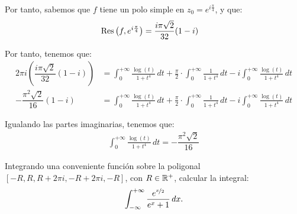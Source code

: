 \begin{ejercicio}
    Por tanto, sabemos que $f$ tiene un polo simple en $z_0 = e^{i\frac{\pi}{4}}$, y que:
    \begin{align*}
        \operatorname{Res}\left(f, e^{i\frac{\pi}{4}}\right) &= \dfrac{i\pi\sqrt{2}}{32}(1-i)
    \end{align*}

    Por tanto, tenemos que:
    \begin{align*}
        2\pi i\left(\dfrac{i\pi\sqrt{2}}{32}(1-i)\right) &= \int_0^{+\infty} \frac{\log(t)}{1 + t^4} \, dt + \frac{\pi}{2}\cdot \int_{0}^{+\infty} \frac{1}{1 + t^4} \, dt - i\int_0^{+\infty} \frac{\log(t)}{1 + t^4} \, dt\\
        -\dfrac{\pi^2\sqrt{2}}{16}(1-i) &= \int_0^{+\infty} \frac{\log(t)}{1 + t^4} \, dt + \frac{\pi}{2}\cdot \int_{0}^{+\infty} \frac{1}{1 + t^4} \, dt - i\int_0^{+\infty} \frac{\log(t)}{1 + t^4} \, dt
    \end{align*}

    Igualando las partes imaginarias, tenemos que:
    \begin{align*}
        \int_0^{+\infty} \frac{\log(t)}{1 + t^4} \, dt
        = -\dfrac{\pi^2\sqrt{2}}{16}
    \end{align*}

    
\end{ejercicio}

\begin{ejercicio}
    Integrando una conveniente función sobre la poligonal $[-R, R, R + 2\pi i, -R + 2\pi i, -R]$, con $R \in \mathbb{R}^+$, calcular la integral:
    \begin{equation*}
        \int_{-\infty}^{+\infty} \frac{e^{\nicefrac{x}{2}}}{e^x + 1} \, dx.
    \end{equation*}
\end{ejercicio}